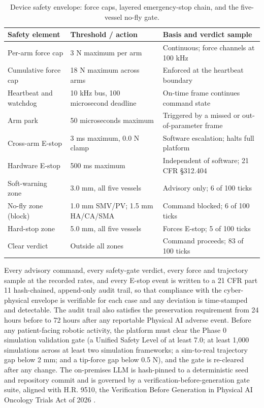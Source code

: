 \begin{table}[t]
\caption{Device safety envelope: force caps, layered emergency-stop chain, and the five-vessel no-fly gate.}
\label{tab:sec04-safety}
\centering
\begin{tabularx}{\textwidth}{L{3.6cm} L{4.6cm} Y}
\toprule
\textbf{Safety element} & \textbf{Threshold / action} & \textbf{Basis and verdict sample} \\
\midrule
Per-arm force cap & 3 N maximum per arm & Continuous; force channels at 100 kHz \\
Cumulative force cap & 18 N maximum across arms & Enforced at the heartbeat boundary \\
Heartbeat and watchdog & 10 kHz bus, 100 microsecond deadline & On-time frame continues command state \\
Arm park & 50 microseconds maximum & Triggered by a missed or out-of-parameter frame \\
Cross-arm E-stop & 3 ms maximum, 0.0 N clamp & Software escalation; halts full platform \\
Hardware E-stop & 500 ms maximum & Independent of software; 21 CFR \S 312.404 \\
Soft-warning zone & 3.0 mm, all five vessels & Advisory only; 6 of 100 ticks \\
No-fly zone (block) & 1.0 mm SMV/PV; 1.5 mm HA/CA/SMA & Command blocked; 6 of 100 ticks \\
Hard-stop zone & 5.0 mm, all five vessels & Forces E-stop; 5 of 100 ticks \\
Clear verdict & Outside all zones & Command proceeds; 83 of 100 ticks \\
\bottomrule
\end{tabularx}
\end{table}

Every advisory command, every safety-gate verdict, every force and trajectory
sample at the recorded rates, and every E-stop event is written to a 21 CFR part 11
hash-chained, append-only audit trail, so that compliance with the cyber-physical
envelope is verifiable for each case and any deviation is time-stamped and
detectable. The audit trail also satisfies the preservation requirement from 24
hours before to 72 hours after any reportable Physical AI adverse event. Before any
patient-facing robotic activity, the platform must clear the Phase 0 simulation
validation gate (a Unified Safety Level of at least 7.0; at least 1,000 simulations
across at least two simulation frameworks; a sim-to-real trajectory gap below 2 mm;
and a tip-force gap below 0.5 N), and the gate is re-cleared after any change. The
on-premises LLM is hash-pinned to a deterministic seed and repository commit and is
governed by a verification-before-generation gate suite, aligned with H.R. 9510,
the Verification Before Generation in Physical AI Oncology Trials Act of 2026
\cite{congress9510,clintrustpai,paiautospons}.

